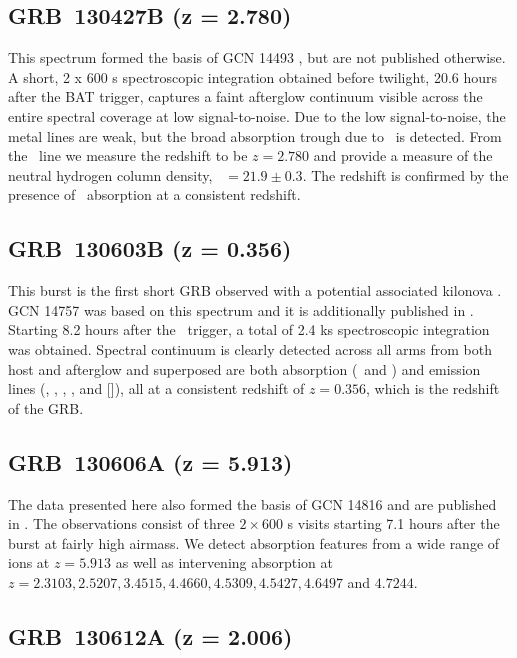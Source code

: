 \documentclass[longauth]{aa}    %
\begin{document}
\subsection{GRB~130427B (z = 2.780)} \label{130427B}

This spectrum formed the basis of GCN 14493 \citep{GCN14493}, but are not
published otherwise. A short, 2 x 600 s spectroscopic integration obtained before
twilight, 20.6 hours after the BAT trigger, captures a faint afterglow continuum
visible across the entire spectral coverage at low signal-to-noise. Due to the
low signal-to-noise, the metal lines are weak, but the broad absorption trough
due to \lya~is detected. From the \lya~line we measure the redshift to be $z =
2.780$ and provide a measure of the neutral hydrogen column density, \nh~$= 21.9
\pm 0.3$. The redshift is confirmed by the presence of \feii~absorption at a
consistent redshift.

\subsection{GRB~130603B (z = 0.356)}\label{130603}

This burst is the first short GRB observed with a potential associated kilonova
\citep{Tanvir2013a, Berger2013a}.  GCN 14757 \citep{GCN14757} was based on this
spectrum and it is additionally published in \citet{DeUgartePostigo2014e}.
Starting 8.2 hours after the \swift~trigger, a total of 2.4 ks spectroscopic
integration was obtained. Spectral continuum is clearly detected across all arms
from both host and afterglow and superposed are both absorption (\cahk~and
\mgii) and emission lines (\oii, \hb, \oiii, \ha, and [\sii]), all at a
consistent redshift of $z = 0.356$, which is the redshift of the GRB.

\subsection{GRB~130606A (z = 5.913)}\label{130606}

The data presented here also formed the basis of GCN 14816 \citep{GCN14816} and
are published in \citet{Hartoog2015}. The observations consist of three
$2\times600$ s visits starting 7.1 hours after the burst at fairly high airmass.
We detect absorption features from a wide range of ions at $z=5.913$ as well as
intervening absorption at $z=2.3103, 2.5207, 3.4515, 4.4660, 4.5309, 4.5427,
4.6497 $ and $ 4.7244$.


\subsection{GRB~130612A (z = 2.006)}\label{130612}
\end{document}
